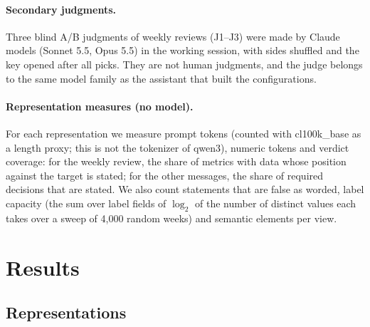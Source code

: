 \documentclass[10pt,twocolumn]{article}
\begin{document}
\paragraph{Secondary judgments.} Three blind A/B judgments of weekly reviews (J1--J3) were made by Claude models
(Sonnet 5.5, Opus 5.5) in the working session, with sides shuffled and the key opened after all picks. They are not
human judgments, and the judge belongs to the same model family as the assistant that built the configurations.

\paragraph{Representation measures (no model).} For each representation we measure prompt tokens (counted with
cl100k\_base as a length proxy; this is not the tokenizer of qwen3), numeric tokens and verdict coverage: for the weekly review,
the share of metrics with data whose position against the target is stated; for the other messages, the share of
required decisions that are stated. We also count statements that are false as worded, label capacity (the sum over
label fields of $\log_2$ of the number of distinct values each takes over a sweep of 4{,}000 random weeks) and
semantic elements per view.

\section{Results}
\label{sec:results}

\subsection{Representations}
\label{sec:res-rep}
\end{document}
